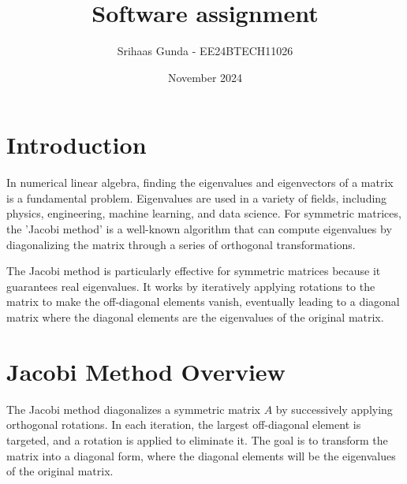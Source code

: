 \documentclass[journal]{IEEEtran}
\title{Software assignment}
\author{Srihaas Gunda - EE24BTECH11026}
\date{November 2024}
\begin{document}
\maketitle
\section*{\textbf{Introduction}}

In numerical linear algebra, finding the eigenvalues and eigenvectors of a matrix is a fundamental problem. Eigenvalues are used in a variety of fields, including physics, engineering, machine learning, and data science. For symmetric matrices, the 'Jacobi method'
 is a well-known algorithm that can compute eigenvalues by diagonalizing the matrix through a series of orthogonal transformations.

The Jacobi method is particularly effective for symmetric matrices because it guarantees real eigenvalues. It works by iteratively applying rotations to the matrix to make the off-diagonal elements vanish, eventually leading to a diagonal matrix where the diagonal elements are the eigenvalues of the original matrix.


\section{Jacobi Method Overview}

The Jacobi method diagonalizes a symmetric matrix $A$ by successively applying orthogonal rotations. In each iteration, the largest off-diagonal element is targeted, and a rotation is applied to eliminate it. The goal is to transform the matrix into a diagonal form, where the diagonal elements will be the eigenvalues of the original matrix.
\end{document}
